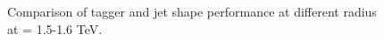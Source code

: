 \begin{figure}
\begin{center}
\caption{Comparison of tagger and jet shape performance at different radius at \pt = 1.5-1.6 TeV.}
\label{fig:Rcomparison_top}
\end{center}
\end{figure}

